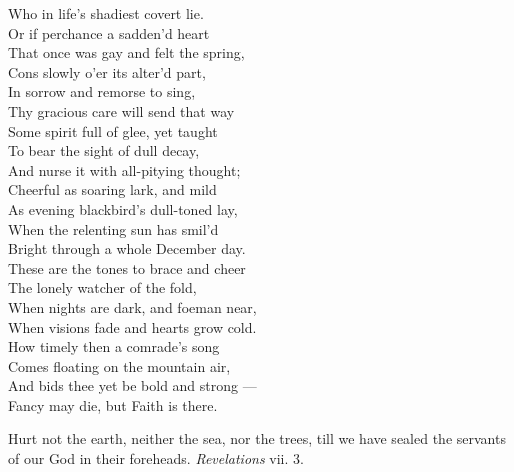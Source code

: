  Who in life’s shadiest covert lie. \\
  Or if perchance a sadden’d heart \\
 That once was gay and felt the spring, \\
 Cons slowly o’er its alter’d part, \\
 In sorrow and remorse to sing, \\
  Thy gracious care will send that way \\
 Some spirit full of glee, yet taught \\
 To bear the sight of dull decay, \\
 And nurse it with all-pitying thought; \\
  Cheerful as soaring lark, and mild \\
 As evening blackbird’s dull-toned lay, \\
 When the relenting sun has smil’d \\
 Bright through a whole December day. \\
  These are the tones to brace and cheer \\
 The lonely watcher of the fold, \\
 When nights are dark, and foeman near, \\
 When visions fade and hearts grow cold. \\
  How timely then a comrade’s song \\
 Comes floating on the mountain air, \\
 And bids thee yet be bold and strong — \\
 Fancy may die, but Faith is there.\\


Hurt not the earth, neither the sea, nor the trees, till we have sealed the servants of our God in their foreheads. \emph{Revelations} vii. 3.

